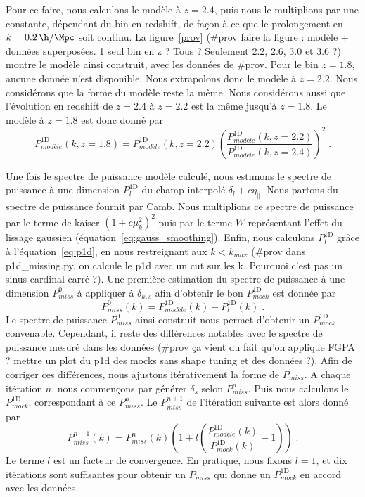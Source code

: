 \documentclass[11pt, twoside, a4paper, openright]{report}
\begin{document}
Pour ce faire, nous calculons le modèle à $z = \num{2.4}$, puis nous le multiplions par une constante, dépendant du bin en redshift, de façon à ce que le prolongement en $k = \SI{0.2}{\h\per\Mpc}$ soit continu.
La figure~\ref{prov} (\#prov faire la figure : modèle + données superposées. 1 seul bin en z ? Tous ? Seulement 2.2, 2.6, 3.0 et 3.6 ?) montre le modèle ainsi construit, avec les données de \#prov.
Pour le bin $z = \num{1.8}$, aucune donnée \lya{} n'est disponible. Nous extrapolons donc le modèle à $z = \num{2.2}$. Nous considérons que la forme du modèle reste la même. Nous considérons aussi que l'évolution en redshift de $z = \num{2.4}$ à $z = \num{2.2}$ est la même jusqu'à $z = \num{1.8}$. Le modèle à $z = \num{1.8}$ est donc donné par
\begin{equation}
  P^{\mathrm{1D}}_{modèle}(k, z=\num{1.8}) = P^{\mathrm{1D}}_{modèle}(k, z=\num{2.2}) \left(\frac{P^{\mathrm{1D}}_{modèle}(k, z=\num{2.2})}{P^{\mathrm{1D}}_{modèle}(k, z=\num{2.4})} \right)^2 \; .
\end{equation}

Une fois le spectre de puissance modèle calculé, nous estimons le spectre de puissance à une dimension $P^{\mathrm{1D}}_{l}$ du champ interpolé $\delta_l + c \eta_{\parallel}$. Nous partons du spectre de puissance fournit par Camb. Nous multiplions ce spectre de puissance par le terme de kaiser $(1 + c \mu_k^2)^2$ puis par le terme $W$ représentant l'effet du lissage gaussien (équation~\ref{eq:gauss_smoothing}). Enfin, nous calculons $P^{\mathrm{1D}}_{l}$ grâce à l'équation~\ref{eq:p1d}, en nous restreignant aux $k < k_{max}$ (\#prov dans p1d\_missing.py, on calcule le p1d avec un cut sur les k. Pourquoi c'est pas un sinus cardinal carré ?).
Une première estimation du spectre de puissance à une dimension $P_{miss}^0$ à appliquer à $\delta_{k,s}$ afin d'obtenir le bon $P_{mock}^{\mathrm{1D}}$ est donnée par
\begin{equation}
  P_{miss}^0(k) = P^{\mathrm{1D}}_{modèle}(k) - P^{\mathrm{1D}}_{l}(k) \; .
\end{equation}
Le spectre de puissance $P_{miss}^0$ ainsi construit nous permet d'obtenir un $P_{mock}^{\mathrm{1D}}$ convenable. Cependant, il reste des différences notables avec le spectre de puissance mesuré dans les données (\#prov ça vient du fait qu'on applique FGPA ? mettre un plot du p1d des mocks sans shape tuning et des données ?). Afin de corriger ces différences, nous ajustons itérativement la forme de $P_{miss}$. A chaque itération $n$, nous commençons par générer $\delta_s$ selon $P_{miss}^n$. Puis nous calculons le $P_{mock}^{\mathrm{1D}}$, correspondant à ce $P_{miss}^n$. Le $P_{miss}^{n+1}$ de l'itération suivante est alors donné par
\begin{equation}
  P_{miss}^{n+1}(k) = P_{miss}^{n}(k) \left( 1 + l \left(
      \frac{
        P_{modèle}^{\mathrm{1D}}(k)
      }{
        P_{mock}^{\mathrm{1D}}(k)
      }
      - 1 \right) \right)
  \; .
\end{equation}
Le terme $l$ est un facteur de convergence. En pratique, nous fixons $l = 1$, et dix itérations sont suffisantes pour obtenir un $P_{miss}$ qui donne un $P^{\mathrm{1D}}_{mock}$ en accord avec les données.
\end{document}
